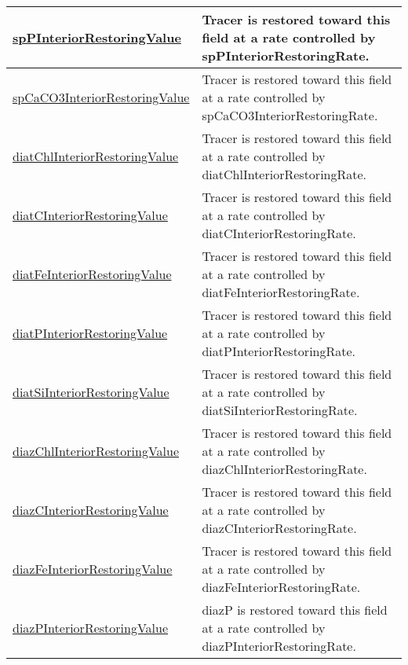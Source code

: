 {\begin{center}
\begin{longtable}{| p{2.0in} | p{4.0in} |}
    \hline
    \hyperref[subsec:var_sec_forcing_spPInteriorRestoringValue]{spPInteriorRestoringValue} & Tracer is restored toward this field at a rate controlled by spPInteriorRestoringRate. \\
    \hline
    \hyperref[subsec:var_sec_forcing_spCaCO3InteriorRestoringValue]{spCaCO3InteriorRestoringValue} & Tracer is restored toward this field at a rate controlled by spCaCO3InteriorRestoringRate. \\
    \hline
    \hyperref[subsec:var_sec_forcing_diatChlInteriorRestoringValue]{diatChlInteriorRestoringValue} & Tracer is restored toward this field at a rate controlled by diatChlInteriorRestoringRate. \\
    \hline
    \hyperref[subsec:var_sec_forcing_diatCInteriorRestoringValue]{diatCInteriorRestoringValue} & Tracer is restored toward this field at a rate controlled by diatCInteriorRestoringRate. \\
    \hline
    \hyperref[subsec:var_sec_forcing_diatFeInteriorRestoringValue]{diatFeInteriorRestoringValue} & Tracer is restored toward this field at a rate controlled by diatFeInteriorRestoringRate. \\
    \hline
    \hyperref[subsec:var_sec_forcing_diatPInteriorRestoringValue]{diatPInteriorRestoringValue} & Tracer is restored toward this field at a rate controlled by diatPInteriorRestoringRate. \\
    \hline
    \hyperref[subsec:var_sec_forcing_diatSiInteriorRestoringValue]{diatSiInteriorRestoringValue} & Tracer is restored toward this field at a rate controlled by diatSiInteriorRestoringRate. \\
    \hline
    \hyperref[subsec:var_sec_forcing_diazChlInteriorRestoringValue]{diazChlInteriorRestoringValue} & Tracer is restored toward this field at a rate controlled by diazChlInteriorRestoringRate. \\
    \hline
    \hyperref[subsec:var_sec_forcing_diazCInteriorRestoringValue]{diazCInteriorRestoringValue} & Tracer is restored toward this field at a rate controlled by diazCInteriorRestoringRate. \\
    \hline
    \hyperref[subsec:var_sec_forcing_diazFeInteriorRestoringValue]{diazFeInteriorRestoringValue} & Tracer is restored toward this field at a rate controlled by diazFeInteriorRestoringRate. \\
    \hline
    \hyperref[subsec:var_sec_forcing_diazPInteriorRestoringValue]{diazPInteriorRestoringValue} & diazP is restored toward this field at a rate controlled by diazPInteriorRestoringRate. \\

\end{longtable}
\end{center}}
